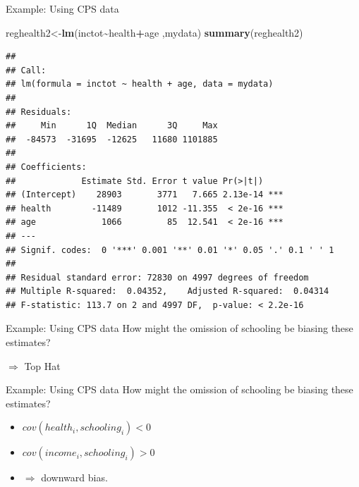 \documentclass[
  ignorenonframetext,
]{beamer}
\newenvironment{Shaded}{\begin{snugshade}}{\end{snugshade}}
\newcommand{\KeywordTok}[1]{\textcolor[rgb]{0.13,0.29,0.53}{\textbf{#1}}}
\newcommand{\NormalTok}[1]{#1}
\newcommand{\OperatorTok}[1]{\textcolor[rgb]{0.81,0.36,0.00}{\textbf{#1}}}
\begin{document}
\begin{frame}[fragile]{Example: Using CPS data}
\protect\hypertarget{example-using-cps-data-4}{}
\tiny

\begin{Shaded}
\begin{Highlighting}[]
\NormalTok{reghealth2\textless{}{-}}\KeywordTok{lm}\NormalTok{(inctot}\OperatorTok{\textasciitilde{}}\NormalTok{health}\OperatorTok{+}\NormalTok{age ,mydata)}
\KeywordTok{summary}\NormalTok{(reghealth2)}
\end{Highlighting}
\end{Shaded}

\begin{verbatim}
## 
## Call:
## lm(formula = inctot ~ health + age, data = mydata)
## 
## Residuals:
##     Min      1Q  Median      3Q     Max 
##  -84573  -31695  -12625   11680 1101885 
## 
## Coefficients:
##             Estimate Std. Error t value Pr(>|t|)    
## (Intercept)    28903       3771   7.665 2.13e-14 ***
## health        -11489       1012 -11.355  < 2e-16 ***
## age             1066         85  12.541  < 2e-16 ***
## ---
## Signif. codes:  0 '***' 0.001 '**' 0.01 '*' 0.05 '.' 0.1 ' ' 1
## 
## Residual standard error: 72830 on 4997 degrees of freedom
## Multiple R-squared:  0.04352,    Adjusted R-squared:  0.04314 
## F-statistic: 113.7 on 2 and 4997 DF,  p-value: < 2.2e-16
\end{verbatim}

\normalsize
\end{frame}

\begin{frame}{Example: Using CPS data}
\protect\hypertarget{example-using-cps-data-5}{}
How might the omission of schooling be biasing these estimates?

\(\Rightarrow\) Top Hat
\end{frame}

\begin{frame}{Example: Using CPS data}
\protect\hypertarget{example-using-cps-data-6}{}
How might the omission of schooling be biasing these estimates?

\begin{itemize}
\item
  \(cov(health_i,schooling_i)<0\)
\item
  \(cov(income_i,schooling_i)>0\)
\item
  \(\Rightarrow\) downward bias.
\end{itemize}
\end{frame}
\end{document}
